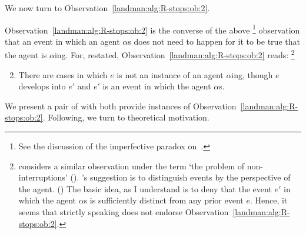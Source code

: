 \begin{note}
  We now turn to Observation~\ref{landman:alg:R-stops:ob:2}.

  Observation~\ref{landman:alg:R-stops:ob:2} is the converse of the above%
  \footnote{
    See the discussion of the imperfective paradox on~.
  }
  observation that an event in which an agent \(\alpha\)s does not need to happen for it to be true that the agent is \(\alpha\)ing.
  For, restated, Observation~\ref{landman:alg:R-stops:ob:2} reads:%
  \footnote{
    \citeauthor{Landman:1992wh} considers a similar observation under the term `the problem of non-interruptions' (\citeyear[14--17,30--31]{Landman:1992wh}).
    \citeauthor{Landman:1992wh}'s suggestion is to distinguish events by the perspective of the agent. (\citeyear[31]{Landman:1992wh})
    The basic idea, as I understand \citeauthor{Landman:1992wh} is to deny that the event \(e'\) in which the agent \(\alpha\)s is sufficiently distinct from any prior event \(e\).
    Hence, it seems that strictly speaking \citeauthor{Landman:1992wh} does not endorse Observation~\ref{landman:alg:R-stops:ob:2}.
  }
  \begin{enumerate}[label=\arabic*\('\)., ref=(\arabic*\('\))]
    \setcounter{enumi}{1}
  \item
    There are cases in which \(e\) is not an instance of an agent \(\alpha\)ing, though \(e\) develops into \(e'\) and \(e'\) is an event in which the agent \(\alpha\)s.
  \end{enumerate}

    We present a pair of  with both provide instances of Observation~\ref{landman:alg:R-stops:ob:2}.
    Following, we turn to theoretical motivation.
\end{note}

